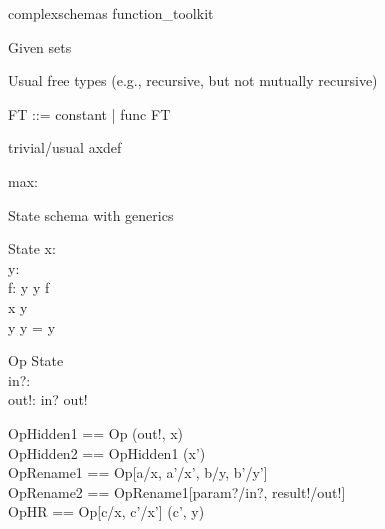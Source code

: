 \documentclass{article}
\begin{document}
\begin{zsection}
\SECTION complexschemas \parents function\_toolkit
\end{zsection}

Given sets
\begin{zed}
   [G]
\end{zed}

Usual free types (e.g., recursive, but not mutually recursive)
\begin{zed}
   FT ::= constant | func \ldata \nat \cross FT \rdata
\end{zed}

trivial/usual axdef
\begin{axdef}
   max: \nat
\end{axdef}

State schema with generics
\begin{schema}{State}
   x: \nat \\
   y: \power~\nat \\
   f: \nat \pfun \nat 
\where
   y \cross y \subseteq f \\
   x \in y \\
   y \cap y = y
\end{schema}

\begin{schema}{Op}
   \Delta State\\
   in?: \nat \\
   out!: \nat 
\where
   in? \neq out!
\end{schema}

\begin{zed}
   OpHidden1 == Op \hide (out!, x) \\
   OpHidden2 == OpHidden1 \hide (x') \\
   OpRename1 == Op[a/x, a'/x', b/y, b'/y'] \\
   OpRename2 == OpRename1[param?/in?, result!/out!] \\
   OpHR	     == Op[c/x, c'/x'] \hide (c', y)
\end{zed}
\end{document}
